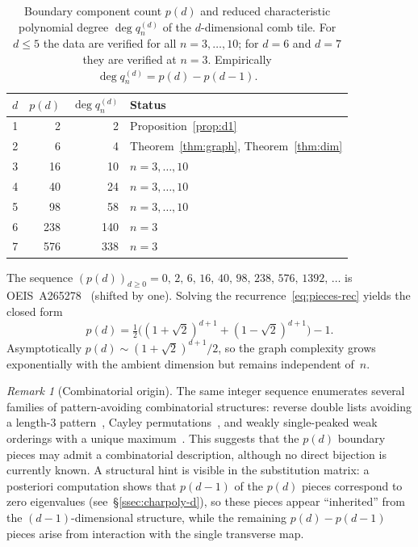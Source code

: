 \documentclass{amsart}
\theoremstyle{definition}
\theoremstyle{remark}
\newtheorem{remark}[theorem]{Remark}
\begin{document}
\begin{table}[h]
\centering
\caption{Boundary component count $p(d)$ and reduced
  characteristic polynomial degree $\deg q_n^{(d)}$ of the
  $d$-dimensional comb tile.  For $d \le 5$ the data are
  verified for all $n = 3, \ldots, 10$; for $d = 6$ and
  $d = 7$ they are verified at $n = 3$.
  Empirically $\deg q_n^{(d)} = p(d) - p(d{-}1)$.}
\label{tab:pieces}
\begin{tabular}{rrrl}
\toprule
$d$ & $p(d)$ & $\deg q_n^{(d)}$ & Status \\
\midrule
1 &     2 &    2 & Proposition~\ref{prop:d1} \\
2 &     6 &    4 & Theorem~\ref{thm:graph}, Theorem~\ref{thm:dim} \\
3 &    16 &   10 & $n = 3, \ldots, 10$ \\
4 &    40 &   24 & $n = 3, \ldots, 10$ \\
5 &    98 &   58 & $n = 3, \ldots, 10$ \\
6 &   238 &  140 & $n = 3$ \\
7 &   576 &  338 & $n = 3$ \\
\bottomrule
\end{tabular}
\end{table}

The sequence
$(p(d))_{d\ge 0} = 0,\, 2,\, 6,\, 16,\, 40,\, 98,\, 238,\, 576,\,
1392,\, \ldots$
is OEIS~A265278~\cite{oeis-A265278} (shifted by one).
Solving the recurrence~\eqref{eq:pieces-rec} yields the closed form
\begin{equation}\label{eq:pieces-closed}
  p(d)
  = \tfrac{1}{2}\bigl((1{+}\sqrt{2})^{d+1}
                      + (1{-}\sqrt{2})^{d+1}\bigr) - 1.
\end{equation}
Asymptotically $p(d) \sim (1{+}\sqrt{2})^{d+1}/2$, so the graph
complexity grows exponentially with the ambient dimension but
remains independent of~$n$.

\begin{remark}[Combinatorial origin]
The same integer sequence enumerates several families of
pattern-avoiding combinatorial structures: reverse double lists
avoiding a length-$3$ pattern~\cite{diepenbroek-maus-stoll},
Cayley permutations~\cite{golab}, and weakly single-peaked weak
orderings with a unique
maximum~\cite{couceiro-devillet-marichal}.
This suggests that the $p(d)$ boundary pieces may admit a
combinatorial description, although no direct bijection is
currently known.
A structural hint is visible in the substitution matrix: a
posteriori computation shows that $p(d{-}1)$ of the $p(d)$
pieces correspond to zero eigenvalues
(see~\S\ref{ssec:charpoly-d}), so these pieces appear
``inherited'' from the $(d{-}1)$-dimensional structure, while
the remaining $p(d) - p(d{-}1)$ pieces arise from interaction
with the single transverse map.
\end{remark}
\end{document}
